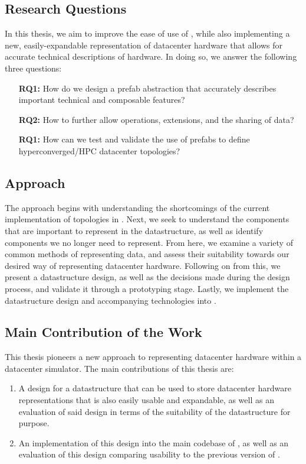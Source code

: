 \documentclass[11pt]{article}
\begin{document}
	\subsection{Research Questions}
		In this thesis, we aim to improve the ease of use of \opendc{}, while also implementing a new, easily-expandable representation of datacenter hardware that allows for accurate technical descriptions of hardware. 
		In doing so, we answer the following three questions:
		\begin{itemize}
			\item [\textbf{RQ1:}] How do we design a prefab abstraction that accurately describes important technical and composable features?
			\item [\textbf{RQ2:}] How to further allow operations, extensions, and the sharing of data?
			\item [\textbf{RQ1:}] How can we test and validate the use of prefabs to define hyperconverged/HPC datacenter topologies?
		\end{itemize}
	
	\subsection{Approach}
		The approach begins with understanding the shortcomings of the current implementation of topologies in \opendc{}.
		Next, we seek to understand the components that are important to represent in the datastructure, as well as identify components we no longer need to represent.
		From here, we examine a variety of common methods of representing data, and assess their suitability towards our desired way of representing datacenter hardware.
		Following on from this, we present a datastructure design, as well as the decisions made during the design process, and validate it through a prototyping stage.
		Lastly, we implement the datastructure design and accompanying technologies into \opendc{}.
	
	\subsection{Main Contribution of the Work}
		This thesis pioneers a new approach to representing datacenter hardware within a datacenter simulator.
		The main contributions of this thesis are:
		\begin{enumerate}
			\item A design for a datastructure that can be used to store datacenter hardware representations that is also easily usable and expandable, as well as an evaluation of said design in terms of the suitability of the datastructure for purpose.
			\item An implementation of this design into the main codebase of \opendc{}, as well as an evaluation of this design comparing usability to the previous version of \opendc{}.
		\end{enumerate}
	
\end{document}
